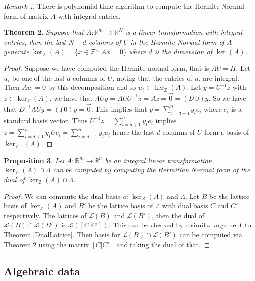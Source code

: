 \documentclass{article}
\newcommand{\Z}[0]{\mathbb{Z}}		%
\newcommand{\R}[0]{\mathbb{R}}		%
\newcommand{\La}[0]{\mathcal L}
\newtheorem{thm}{Theorem}[section]
\newtheorem{prop}[thm]{Proposition}
\theoremstyle{definition}
\theoremstyle{remark}
\newtheorem{rem}[thm]{Remark}
\begin{document}
\begin{rem}
There is polynomial time algorithm to compute the Hermite Normal form of matrix $A$ with integral entries. \cite{KoppeJesusBook} 
\end{rem}
\begin{thm}\label{LatticeBasis} %
Suppose that $A:\R^m\to \R^N$ is a linear transformation with integral entries, then the last $N-d$ columns of $U$ in the Hermite Normal form of $A$ generate $\ker_\Z (A) =\{ x\in \Z^n: Ax = 0\}$ where $d$ is the dimension of $\ker(A)$.  
\end{thm}
\begin{proof}

 Suppose we have computed the Hermite normal form, that is $AU = H$. Let $u_i$ be one of the last $d$ columns of $U$, noting that the entries of $u_i$ are integral. Then $Au_i = 0$ by this decomposition and so $u_i\in \ker_{\Z}(A)$. Let $y = U^{-1}z$ with $z\in \ker_{\Z}(A)$, we have that $AUy = AUU^{-1}z = Az = \vec{0} = (D~0)y$. So we have that $D^{-1}AUy = (I~0)y =\vec{0}$. This implies that $y = \sum\limits_{i=d+1}^n y_ie_i$ where $e_i$ is a standard basis vector. Thus $U^{-1}z =\sum\limits_{i=d+1}^n y_ie_i  $ implies $z  =\sum\limits_{i=d+1}^n y_iUe_i =\sum\limits_{i=d+1}^n y_iu_i   $ hence the last $d$ columns of $U$ form a basis of $\ker_{\Z^m}(A). $ 

\end{proof}



\begin{prop}
Let $A:\R^m \to \R^n$ be an integral linear transformation. $\ker_\Z(A) \cap \Lambda$ can be computed by computing the Hermitian Normal form of the dual of $\ker_\Z(A) \cap \Lambda$.
\end{prop}
\begin{proof}
We can commute the dual basis of $\ker_Z(A)$ and $\Lambda$. Let $B$ be the lattice basis of $\ker_\Z(A)$ and $B'$ be the lattice basis of $\Lambda$ with dual basis $C$ and $C'$ respectively.   The lattices of $\La(B)$ and $\La(B')$, then the dual of $\La(B)\cap \La(B')$ is $\La([C|C'])$. This can be checked by a similar argument to Theorem \ref{DualLattice}. Then basis for $\La(B)\cap \La(B')$ can be computed via Theorem \ref{LatticeBasis} using the matrix $[C|C']$ and taking the dual of that. 
\end{proof}



\subsection{Algebraic data}
\end{document}
